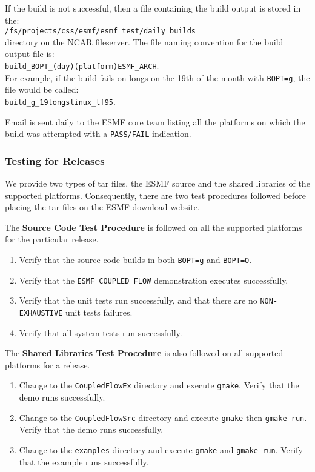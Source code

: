 If the build is not successful, then a file containing the build output is stored in 
the:\\
{\tt /fs/projects/css/esmf/esmf\_test/daily\_builds}\\
directory on the NCAR fileserver. The file naming convention for the build output file is:\\
{\tt build\_BOPT\_(day)(platform)ESMF\_ARCH}.\\
For example, if the build fails on longs on the 19th of the month with {\tt BOPT=g},
the file would be called:\\
{\tt build\_g\_19longslinux\_lf95}. 

Email is sent daily to the ESMF core team listing all the platforms on which the build was attempted with a {\tt PASS/FAIL} indication. 

\subsubsection{Testing for Releases}

We provide two types of tar files, the ESMF source and the shared
libraries of the supported platforms. Consequently, there are two test
procedures followed before placing the tar files on the ESMF download website. 

The {\bf Source Code Test Procedure} is followed on all the supported
platforms for the particular release.

\begin{enumerate}
\item Verify that the source code builds in both {\tt BOPT=g} and {\tt BOPT=O}.
\item Verify that  the {\tt ESMF\_COUPLED\_FLOW} demonstration executes successfully.
\item Verify that the unit tests run successfully, and that there are no {\tt NON-EXHAUSTIVE} unit tests  failures.
\item Verify that all system tests run successfully. 
\end{enumerate}

The {\bf Shared Libraries Test Procedure} is also followed on all supported
platforms for a release.

\begin{enumerate}
\item Change to the {\tt CoupledFlowEx} directory and execute {\tt gmake}. Verify that the demo runs successfully.
\item Change to the {\tt CoupledFlowSrc} directory and execute {\tt gmake} then {\tt gmake run}. Verify that the demo runs successfully.
\item Change to the {\tt examples} directory and execute {\tt gmake} and {\tt gmake run}. Verify that the example runs successfully.
\end{enumerate}














